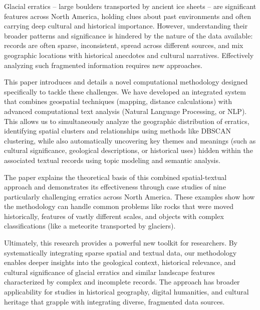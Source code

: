 \documentclass[
11pt, %
english, %
singlespacing, %
headsepline, %
]{MastersDoctoralThesis} %
\begin{document}
\begin{execSummary}
\addchaptertocentry{\execname}
Glacial erratics – large boulders transported by ancient ice sheets – are significant features across North America, holding clues about past environments and often carrying deep cultural and historical importance. However, understanding their broader patterns and significance is hindered by the nature of the data available: records are often sparse, inconsistent, spread across different sources, and mix geographic locations with historical anecdotes and cultural narratives. Effectively analyzing such fragmented information requires new approaches.

This paper introduces and details a novel computational methodology designed specifically to tackle these challenges. We have developed an integrated system that combines geospatial techniques (mapping, distance calculations) with advanced computational text analysis (Natural Language Processing, or NLP). This allows us to simultaneously analyze the geographic distribution of erratics, identifying spatial clusters and relationships using methods like DBSCAN clustering, while also automatically uncovering key themes and meanings (such as cultural significance, geological descriptions, or historical uses) hidden within the associated textual records using topic modeling and semantic analysis.

The paper explains the theoretical basis of this combined spatial-textual approach and demonstrates its effectiveness through case studies of nine particularly challenging erratics across North America. These examples show how the methodology can handle common problems like rocks that were moved historically, features of vastly different scales, and objects with complex classifications (like a meteorite transported by glaciers).

Ultimately, this research provides a powerful new toolkit for researchers. By systematically integrating sparse spatial and textual data, our methodology enables deeper insights into the geological context, historical relevance, and cultural significance of glacial erratics and similar landscape features characterized by complex and incomplete records. The approach has broader applicability for studies in historical geography, digital humanities, and cultural heritage that grapple with integrating diverse, fragmented data sources.
\end{execSummary}

\end{document}
